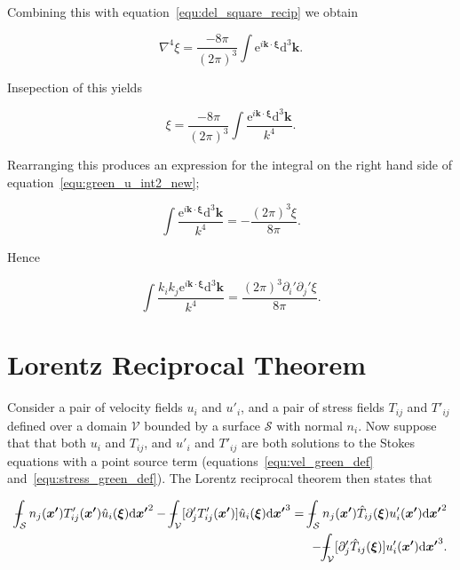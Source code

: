 \documentclass[12pt]{article}
\def\Xint#1{\mathchoice
{\XXint\displaystyle\textstyle{#1}}%
{\XXint\textstyle\scriptstyle{#1}}%
{\XXint\scriptstyle\scriptscriptstyle{#1}}%
{\XXint\scriptscriptstyle\scriptscriptstyle{#1}}%
\!\int}
\def\XXint#1#2#3{{\setbox0=\hbox{$#1{#2#3}{\int}$}
\vcenter{\hbox{$#2#3$}}\kern-.5\wd0}}
\def\dashint{\Xint-}
\begin{document}
Combining this with equation~\ref{equ:del_square_recip} we obtain

\begin{equation}
\label{equ:del4_int}
\nabla^{4} \xi = \frac{-8 \pi}{(2 \pi)^{3}} \int \mathrm{e}^{i \boldsymbol{k} \cdot \boldsymbol{\xi}} \mathrm{d}^{3} \boldsymbol{k} .
\end{equation}

Insepection of this yields

\begin{equation}
\label{equ:del4_int_int}
\xi = \frac{-8 \pi}{(2 \pi)^{3}} \int \frac{\mathrm{e}^{i \boldsymbol{k} \cdot \boldsymbol{\xi}} \mathrm{d}^{3} \boldsymbol{k}}{k^{4}} .
\end{equation}

Rearranging this produces an expression for the integral on the right hand side of equation~\ref{equ:green_u_int2_new};

\begin{equation}
\label{equ:green_u_int2_new_express}
\int \frac{\mathrm{e}^{i \boldsymbol{k} \cdot \boldsymbol{\xi}} \mathrm{d}^{3} \boldsymbol{k}}{k^{4}} = -\frac{(2 \pi)^{3} \xi}{8 \pi} .
\end{equation}

Hence

\begin{equation}
\label{equ:green_u_int2}
\int \frac{k_{i} k_{j} \mathrm{e}^{i \boldsymbol{k} \cdot \boldsymbol{\xi}} \mathrm{d}^{3} \boldsymbol{k}}{k^{4}} = \frac{(2 \pi)^{3} \partial_{i}' \partial_{j}' \xi}{8 \pi} .
\end{equation}


\section{Lorentz Reciprocal Theorem}
\label{app:Lorentz}

Consider a pair of velocity fields $u_{i}$ and $u'_{i}$, and a pair of stress fields $T_{ij}$ and $T'_{ij}$ defined over a domain $\mathcal{V}$ bounded by a surface $\mathcal{S}$ with normal $n_{i}$. Now suppose that that both $u_{i}$ and $T_{ij}$, and $u'_{i}$ and $T'_{ij}$ are both solutions to the Stokes equations with a point source term (equations~\ref{equ:vel_green_def} and~\ref{equ:stress_green_def}). The Lorentz reciprocal theorem then states that \citep{Kim05}

\begin{align}
\label{equ:LRT}
\dashint_{\mathcal{S}} n_{j}(\boldsymbol{x'}) T'_{ij}(\boldsymbol{x'}) \hat{u}_{i}(\boldsymbol{\xi}) \mathrm{d} \boldsymbol{x'}^{2} - \dashint_{\mathcal{V}} [\partial'_{j} T'_{ij}(\boldsymbol{x'})] \hat{u}_{i}(\boldsymbol{\xi}) \mathrm{d} \boldsymbol{x'}^{3} = \dashint_{\mathcal{S}} n_{j}(\boldsymbol{x'}) \hat{T}_{ij}(\boldsymbol{\xi}) u'_{i}(\boldsymbol{x'}) \mathrm{d} \boldsymbol{x'}^{2} \nonumber \\
- \dashint_{\mathcal{V}} [\partial'_{j}\hat{T}_{ij}(\boldsymbol{\xi})] u'_{i}(\boldsymbol{x'}) \mathrm{d} \boldsymbol{x'}^{3} .
\end{align}
\end{document}
